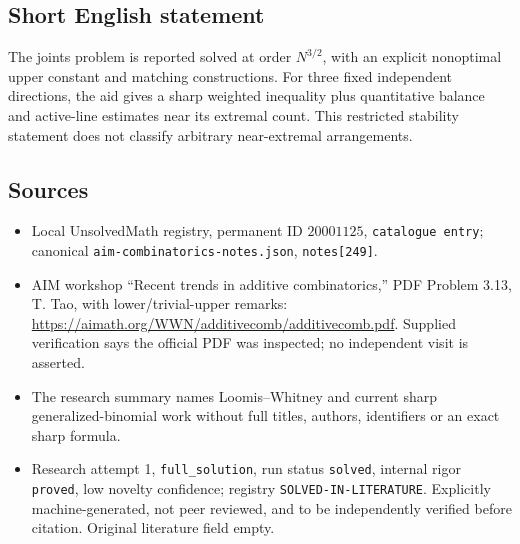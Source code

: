 \documentclass[11pt]{article}
\begin{document}
\subsection{Short English statement}
The joints problem is reported solved at order $N^{3/2}$, with an explicit nonoptimal upper constant and matching constructions. For three fixed independent directions, the aid gives a sharp weighted inequality plus quantitative balance and active-line estimates near its extremal count. This restricted stability statement does not classify arbitrary near-extremal arrangements.
\subsection{Sources}
\begin{itemize}
\item Local UnsolvedMath registry, permanent ID $20001125$, \texttt{catalogue entry}; canonical \texttt{aim-combinatorics-notes.json}, \texttt{notes[249]}.
\item AIM workshop ``Recent trends in additive combinatorics,'' PDF Problem 3.13, T. Tao, with lower/trivial-upper remarks: \url{https://aimath.org/WWN/additivecomb/additivecomb.pdf}. Supplied verification says the official PDF was inspected; no independent visit is asserted.
\item The research summary names Loomis--Whitney and current sharp generalized-binomial work without full titles, authors, identifiers or an exact sharp formula.
\item Research attempt 1, \texttt{full\_solution}, run status \texttt{solved}, internal rigor \texttt{proved}, low novelty confidence; registry \texttt{SOLVED-IN-LITERATURE}. Explicitly machine-generated, not peer reviewed, and to be independently verified before citation. Original literature field empty.
\end{itemize}
\end{document}
